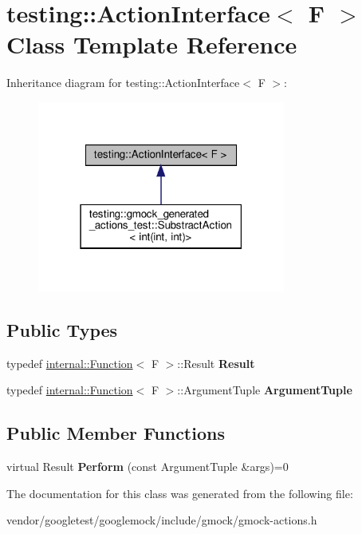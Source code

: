 \hypertarget{classtesting_1_1_action_interface}{}\section{testing\+:\+:Action\+Interface$<$ F $>$ Class Template Reference}
\label{classtesting_1_1_action_interface}


Inheritance diagram for testing\+:\+:Action\+Interface$<$ F $>$\+:
\nopagebreak
\begin{figure}[H]
\begin{center}
\leavevmode
\includegraphics[width=231pt]{classtesting_1_1_action_interface__inherit__graph}
\end{center}
\end{figure}
\subsection*{Public Types}
\begin{DoxyCompactItemize}
\item 
\mbox{\label{classtesting_1_1_action_interface_a7477de2fe3e4e01c59db698203acaee7}} 
typedef \hyperlink{structtesting_1_1internal_1_1_function}{internal\+::\+Function}$<$ F $>$\+::Result {\bfseries Result}
\item 
\mbox{\label{classtesting_1_1_action_interface_af72720d864da4d606629e83edc003511}} 
typedef \hyperlink{structtesting_1_1internal_1_1_function}{internal\+::\+Function}$<$ F $>$\+::Argument\+Tuple {\bfseries Argument\+Tuple}
\end{DoxyCompactItemize}
\subsection*{Public Member Functions}
\begin{DoxyCompactItemize}
\item 
\mbox{\label{classtesting_1_1_action_interface_a20f8624fcea1786f2992b358760422a0}} 
virtual Result {\bfseries Perform} (const Argument\+Tuple \&args)=0
\end{DoxyCompactItemize}


The documentation for this class was generated from the following file\+:\begin{DoxyCompactItemize}
\item 
vendor/googletest/googlemock/include/gmock/gmock-\/actions.\+h\end{DoxyCompactItemize}
